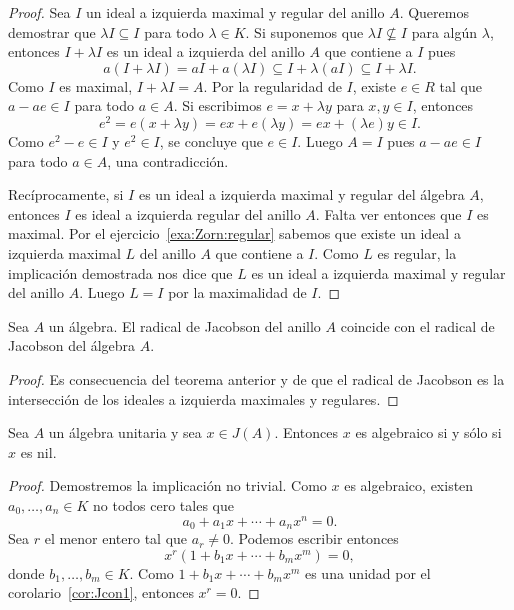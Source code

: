 \begin{proof}
	Sea $I$ un ideal a izquierda maximal y regular del anillo $A$.  Queremos
	demostrar que $\lambda I\subseteq I$ para todo $\lambda\in K$. Si suponemos
	que $\lambda I\not\subseteq I$ para algún $\lambda$, entonces $I+\lambda I$
	es un ideal a izquierda del anillo $A$ que contiene a $I$ pues
	\[
	a(I+\lambda I)=aI+a(\lambda I)\subseteq I+\lambda (aI)\subseteq I+\lambda I.
	\]
	Como $I$ es maximal, $I+\lambda I=A$. Por la regularidad de $I$, existe $e\in R$ tal que
	$a-ae\in I$ para todo $a\in A$. Si escribimos $e=x+\lambda y$ para $x,y\in
	I$, entonces
	\[
		e^2=e(x+\lambda y)=ex+e(\lambda y)=ex+(\lambda e)y\in I.
	\]
	Como $e^2-e\in I$ y $e^2\in I$, se concluye que $e\in I$. Luego $A=I$ pues
	$a-ae\in I$ para todo $a\in A$, una contradicción.

	Recíprocamente, si $I$ es un ideal a izquierda maximal y regular del
	álgebra $A$, entonces $I$ es ideal a izquierda regular del anillo $A$.
	Falta ver entonces que $I$ es maximal. Por el
	ejercicio~\ref{exa:Zorn:regular} sabemos que existe un ideal a izquierda
	maximal $L$ del anillo $A$ que contiene a $I$. Como $L$ es regular, la
	implicación demostrada nos dice que $L$ es un ideal a izquierda maximal y
	regular del anillo $A$. Luego $L=I$ por la maximalidad de $I$.
\end{proof}

\begin{corollary}
	Sea $A$ un álgebra. El radical de Jacobson del anillo $A$ coincide con el
	radical de Jacobson del álgebra $A$.
\end{corollary}

\begin{proof}
	Es consecuencia del teorema anterior y de que el radical de Jacobson es la
	intersección de los ideales a izquierda maximales y regulares.
\end{proof}

\begin{lemma}
	\label{lemma:algebraico=nil}
	Sea $A$ un álgebra unitaria y sea $x\in J(A)$. 
	Entonces $x$ es algebraico si y sólo si $x$ es nil.
\end{lemma}

\begin{proof}
	Demostremos la implicación no trivial. Como $x$ es algebraico, 
	existen $a_0,\dots,a_n\in K$ no todos cero tales que
	\[
		a_0+a_1x+\cdots+a_nx^n=0.
	\]
	Sea $r$ el menor entero tal que $a_r\ne 0$. Podemos escribir entonces
	\[
		x^r(1+b_1x+\cdots+b_mx^m)=0,
	\]
	donde $b_1,\dots,b_m\in K$.  Como $1+b_1x+\cdots+b_mx^m$ es una unidad por
	el corolario~\ref{cor:Jcon1}, entonces $x^r=0$.
\end{proof}


